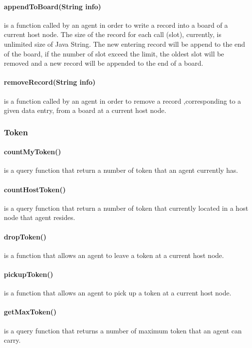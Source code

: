 \paragraph{appendToBoard(String info)} is a function called by an agent in order to write a record into a board of a current host node. The size of the record for each call (slot), currently, is unlimited size of Java String. The new entering record will be append to the end of the board, if the number of slot exceed the limit, the oldest slot will be removed and a new record will be appended to the end of a board.

\paragraph{removeRecord(String info)} is a function called by an agent in order to remove a record ,corresponding to a given data entry, from a board at a current host node.


\subsubsection*{Token}

\paragraph{countMyToken()} is a query function that return a number of token that an agent currently has.

\paragraph{countHostToken()} is a query function that return a number of token that currently located in a host node that agent resides.

\paragraph{dropToken()} is a function that allows an agent to leave a token at a current host node.

\paragraph{pickupToken()} is a function that allows an agent to pick up a token at a current host node.

\paragraph{getMaxToken()} is a query function that returns a number of maximum token that an agent can carry.




